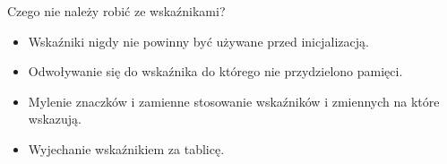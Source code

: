 \documentclass[notheorems, aspectratio=54]{beamer}
\begin{document}
\begin{frame}
Czego nie należy robić ze wskaźnikami?\\
\begin{itemize}
\item Wskaźniki nigdy nie powinny być używane przed inicjalizacją.\\
\item Odwoływanie się do wskaźnika do którego nie przydzielono pamięci.\\
\item Mylenie znaczków i zamienne stosowanie wskaźników i zmiennych na które wskazują.\\
\item Wyjechanie wskaźnikiem za tablicę.
\end{itemize}


\end{frame}
\end{document}
